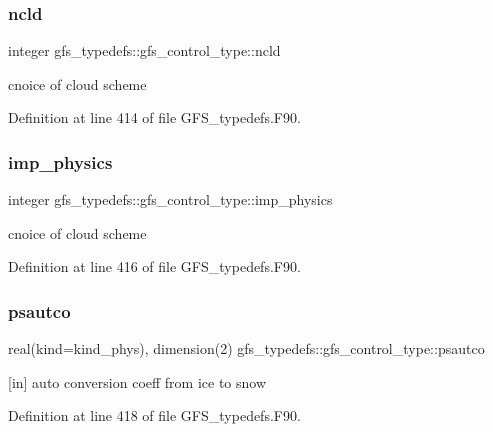 \subsubsection{ncld}
{\footnotesize\ttfamily integer gfs\+\_\+typedefs\+::gfs\+\_\+control\+\_\+type\+::ncld}



cnoice of cloud scheme 



Definition at line 414 of file G\+F\+S\+\_\+typedefs.\+F90.

\mbox{\label{structgfs__typedefs_1_1gfs__control__type_a939fd154b23a25d6aa94c7e5b57d0911}} 
\subsubsection{imp\+\_\+physics}
{\footnotesize\ttfamily integer gfs\+\_\+typedefs\+::gfs\+\_\+control\+\_\+type\+::imp\+\_\+physics}



cnoice of cloud scheme 



Definition at line 416 of file G\+F\+S\+\_\+typedefs.\+F90.

\mbox{\label{structgfs__typedefs_1_1gfs__control__type_a8cd9ed6290c47cb230125ac0b7b9f9fd}} 
\subsubsection{psautco}
{\footnotesize\ttfamily real(kind=kind\+\_\+phys), dimension(2) gfs\+\_\+typedefs\+::gfs\+\_\+control\+\_\+type\+::psautco}



[in] auto conversion coeff from ice to snow 



Definition at line 418 of file G\+F\+S\+\_\+typedefs.\+F90.

\mbox{\label{structgfs__typedefs_1_1gfs__control__type_a41504dcd3aadde149b64be1463fc1f78}} 
